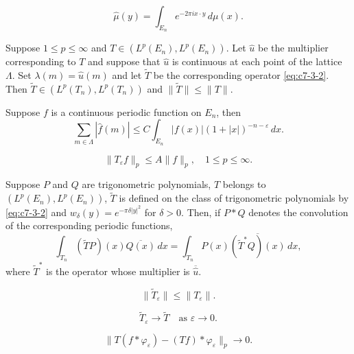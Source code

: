 \begin{equation}\label{eq:c7-3-7}
\hat{\mu}(y) = \int_{E_n} e^{-2\pi i x \cdot y}\,d\mu(x).
\end{equation}

\begin{theorem}\label{thm:c7-3-8}
Suppose $1 \leq p \leq \infty$ and $T \in (L^p(E_n), L^p(E_n))$. Let $\hat{u}$ be the multiplier corresponding to $T$ and suppose that $\hat{u}$ is continuous at each point of the lattice $\Lambda$. Set $\lambda(m) = \hat{u}(m)$ and let $\tilde{T}$ be the corresponding operator \eqref{eq:c7-3-2}. Then $\tilde{T} \in (L^p(T_n), L^p(T_n))$ and $\|\tilde{T}\| \leq \|T\|$.
\end{theorem}

\begin{lemma}\label{lem:c7-3-9}
Suppose $f$ is a continuous periodic function on $E_n$, then
\[
\sum_{m \in \Lambda} |\hat{f}(m)| \leq C \int_{E_n} |f(x)| (1 + |x|)^{-n - \varepsilon}\,dx.
\]
\end{lemma}

\begin{equation}\label{eq:c7-3-10}
\|T_\varepsilon f\|_p \leq A \|f\|_p, \quad 1 \leq p \leq \infty.
\end{equation}

\begin{lemma}\label{lem:c7-3-11}
Suppose $P$ and $Q$ are trigonometric polynomials, $T$ belongs to $(L^p(E_n), L^p(E_n))$, $\tilde{T}$ is defined on the class of trigonometric polynomials by \eqref{eq:c7-3-2} and $w_\delta(y) = e^{-\pi \delta |y|^2}$ for $\delta > 0$. Then, if $P * Q$ denotes the convolution of the corresponding periodic functions,
\[
\int_{T_n} (\tilde{T}P)(x) \overline{Q(x)}\,dx = \int_{T_n} P(x) \overline{(\tilde{T}^* Q)(x)}\,dx,
\]
where $\tilde{T}^*$ is the operator whose multiplier is $\overline{\hat{u}}$.
\end{lemma}

\begin{equation}\label{eq:c7-3-12}
\|\tilde{T}_\varepsilon\| \leq \|T_\varepsilon\|.
\end{equation}

\begin{equation}\label{eq:c7-3-13}
\tilde{T}_\varepsilon \to \tilde{T} \quad \text{as } \varepsilon \to 0.
\end{equation}

\begin{equation}\label{eq:c7-3-14}
\|T(f * \varphi_\varepsilon) - (Tf) * \varphi_\varepsilon\|_p \to 0.
\end{equation}

